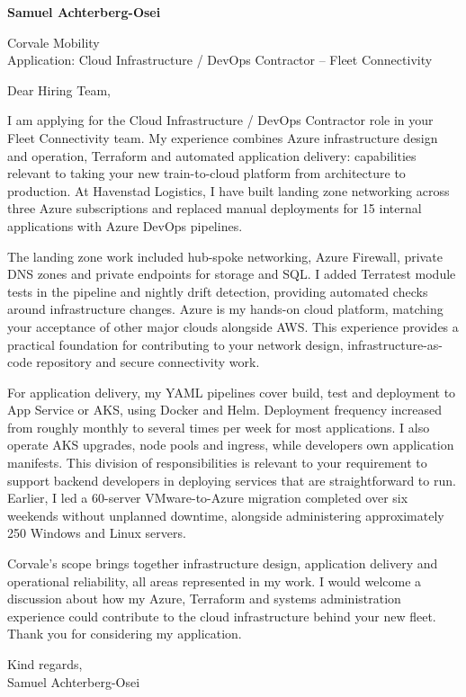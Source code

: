 \documentclass[11pt,a4paper]{article}
\begin{document}
{\large\bfseries\color{primarycolor} Samuel Achterberg-Osei}\par

Corvale Mobility\\
Application: Cloud Infrastructure / DevOps Contractor – Fleet Connectivity

Dear Hiring Team,

I am applying for the Cloud Infrastructure / DevOps Contractor role in your Fleet Connectivity team. My experience combines Azure infrastructure design and operation, Terraform and automated application delivery: capabilities relevant to taking your new train-to-cloud platform from architecture to production. At Havenstad Logistics, I have built landing zone networking across three Azure subscriptions and replaced manual deployments for 15 internal applications with Azure DevOps pipelines.

The landing zone work included hub-spoke networking, Azure Firewall, private DNS zones and private endpoints for storage and SQL. I added Terratest module tests in the pipeline and nightly drift detection, providing automated checks around infrastructure changes. Azure is my hands-on cloud platform, matching your acceptance of other major clouds alongside AWS. This experience provides a practical foundation for contributing to your network design, infrastructure-as-code repository and secure connectivity work.

For application delivery, my YAML pipelines cover build, test and deployment to App Service or AKS, using Docker and Helm. Deployment frequency increased from roughly monthly to several times per week for most applications. I also operate AKS upgrades, node pools and ingress, while developers own application manifests. This division of responsibilities is relevant to your requirement to support backend developers in deploying services that are straightforward to run. Earlier, I led a 60-server VMware-to-Azure migration completed over six weekends without unplanned downtime, alongside administering approximately 250 Windows and Linux servers.

Corvale's scope brings together infrastructure design, application delivery and operational reliability, all areas represented in my work. I would welcome a discussion about how my Azure, Terraform and systems administration experience could contribute to the cloud infrastructure behind your new fleet. Thank you for considering my application.

Kind regards,\\
Samuel Achterberg-Osei
\end{document}

